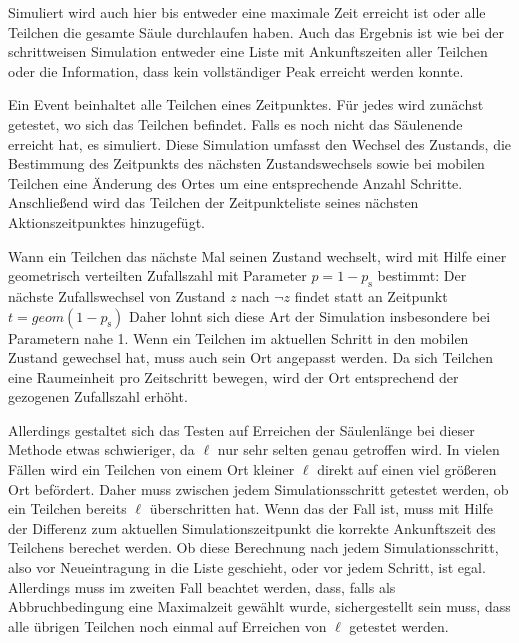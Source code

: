 Simuliert wird auch hier bis entweder eine maximale Zeit erreicht ist oder alle Teilchen die gesamte Säule durchlaufen haben. Auch das Ergebnis ist wie bei der schrittweisen Simulation entweder eine Liste mit Ankunftszeiten aller Teilchen oder die Information, dass kein vollständiger Peak erreicht werden konnte.


Ein Event beinhaltet alle Teilchen eines Zeitpunktes. Für jedes wird zunächst getestet, wo sich das Teilchen befindet. Falls es noch nicht das Säulenende erreicht hat, es simuliert. Diese Simulation umfasst den Wechsel des Zustands, die Bestimmung des Zeitpunkts des nächsten Zustandswechsels sowie bei mobilen Teilchen eine Änderung des Ortes um eine entsprechende Anzahl Schritte. Anschließend wird das Teilchen der Zeitpunkteliste seines nächsten Aktionszeitpunktes hinzugefügt.

Wann ein Teilchen das nächste Mal seinen Zustand wechselt, wird mit Hilfe einer geometrisch verteilten Zufallszahl mit Parameter $p=1-p_\text{s}$ bestimmt: Der nächste Zufallswechsel von Zustand $z$ nach $\neg z$ findet statt an Zeitpunkt $t= geom(1-p_{\text{s}})$ %
Daher lohnt sich diese Art der Simulation insbesondere bei Parametern nahe 1. 
Wenn ein Teilchen im aktuellen Schritt in den mobilen Zustand gewechsel hat, muss auch sein Ort angepasst werden. Da sich Teilchen eine Raumeinheit pro Zeitschritt bewegen, wird der Ort entsprechend der gezogenen Zufallszahl erhöht.

Allerdings gestaltet sich das Testen auf Erreichen der Säulenlänge bei dieser Methode etwas schwieriger, da $\ell$ nur sehr selten genau getroffen wird. In vielen Fällen wird ein Teilchen von einem Ort kleiner $\ell$ direkt auf einen viel größeren Ort befördert. Daher muss zwischen jedem Simulationsschritt getestet werden, ob ein Teilchen bereits $\ell$ überschritten hat. Wenn das der Fall ist, muss mit Hilfe der Differenz zum aktuellen Simulationszeitpunkt die korrekte Ankunftszeit des Teilchens berechet werden.
Ob diese Berechnung nach jedem Simulationsschritt, also vor Neueintragung in die Liste geschieht, oder vor jedem Schritt, ist egal. Allerdings muss im zweiten Fall beachtet werden, dass, falls als Abbruchbedingung eine Maximalzeit gewählt wurde, sichergestellt sein muss, dass alle übrigen Teilchen noch einmal auf Erreichen von $\ell$ getestet werden.

